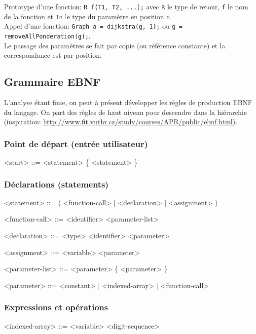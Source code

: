 \documentclass[french]{article}
\begin{document}
			Prototype d'une fonction: \texttt{R f(T1, T2, ...);} avec \texttt{R} le type de retour, \texttt{f} le nom de la fonction et \texttt{Tn} le type du paramètre en position \texttt{n}.\\
			
			Appel d'une fonction: \texttt{Graph a = dijkstra(g, 1);} ou \texttt{g = removeAllPonderation(g);}.\\
			
			Le passage des paramètres se fait par copie (ou référence constante) et la correspondance est par position.
			
		\subsection{Grammaire EBNF} %
			L'analyse étant finie, on peut à présent développer les règles de production EBNF du langage. On part des règles de haut niveau pour descendre dans la hiérarchie (inspiration: \url{http://www.fit.vutbr.cz/study/courses/APR/public/ebnf.html}).
			
			\subsubsection{Point de départ (entrée utilisateur)}
				\begin{grammar}
					<start> ::= <statement> \{ <statement> \}
				\end{grammar}
			
			\subsubsection{Déclarations (statements)}
				\begin{grammar}
					<statement> ::= ( <function-call> | <declaration> | <assignment> ) \lit{;}
					
					<function-call> ::= <identifier> <parameter-list>
					
					<declaration> ::= <type> <identifier> \lit{=} <parameter>
					
					<assignment> ::= <variable> \lit{=} <parameter>
					
					<parameter-list> ::= \lit{(} <parameter> \{ \lit{,} <parameter> \} \lit{)}
					
					<parameter> ::= <constant> | <indexed-array> | <function-call>
				\end{grammar}
			
			\subsubsection{Expressions et opérations}
				\begin{grammar}
					<indexed-array> ::= <variable> \lit{[} <digit-sequence> \lit{]}
				\end{grammar}
			
\end{document}
